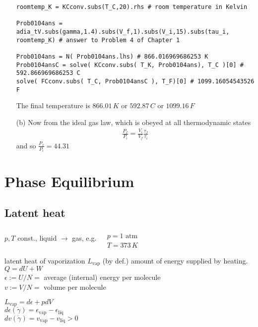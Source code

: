 \documentclass[10pt]{amsart}
\begin{document}
\begin{multicols*}{2}
\begin{enumerate}
\begin{lstlisting}
roomtemp_K = KCconv.subs(T_C,20).rhs # room temperature in Kelvin                               

Prob0104ans = adia_tV.subs(gamma,1.4).subs(V_f,1).subs(V_i,15).subs(tau_i, roomtemp_K) # answer to Problem 4 of Chapter 1                                                                           

Prob0104ans = N( Prob0104ans.lhs) # 866.016969686253 K                                         
Prob0104ansC = solve( KCconv.subs( T_K, Prob0104ans), T_C )[0] # 592.866969686253 C            
solve( FCconv.subs( T_C, Prob0104ansC ), T_F)[0] # 1099.16054543526 F   
\end{lstlisting}

The final temperature is $866.01 \, K$ or $592.87 \, C$ or $1099.16 \, F$

\item[(b)] Now from the ideal gas law, which is obeyed at all thermodynamic states
\[
\begin{gathered}
  \frac{P_f}{ P_i} = \frac{V_i}{V_f} \frac{ \tau_f}{ \tau_i}
\end{gathered}
\]
and so $\frac{P_f}{P_i} = 44.31$
\end{enumerate}


\section{Phase Equilibrium}

\subsection{Latent heat}

$p,T$ const., liquid $\to $ gas, e.g. $ \begin{aligned} & \quad \\
  & p = 1 \text{ atm } \\
  & T = 373 \, K \end{aligned}$

latent heat of vaporization $L_{\text{vap}}$ (by def.) amount of energy supplied by heating.  \\
$Q = dU + W$ \\
$\epsilon := U/N = $ average (internal) energy per molecule  \\
$v:= V/N = $ volume per molecule 

$L_{\text{vap}} = d\epsilon + p dV$ \\
\phantom{\quad \, } $d\epsilon(\dot{\gamma}) = \epsilon_{\text{vap}} - \epsilon_{\text{liq}}$ \\
\phantom{\quad \, } $dv(\dot{\gamma}) = v_{\text{vap}} - v_{\text{liq}} >0$


\end{multicols*}
\end{document}
